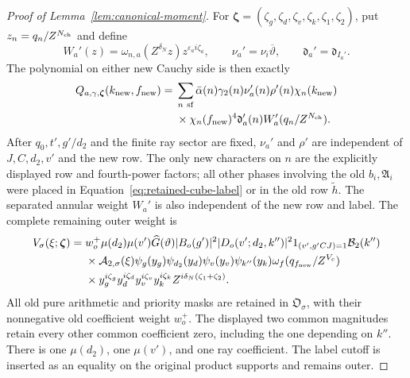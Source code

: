 \documentclass[11pt,a4paper]{article}
\numberwithin{equation}{section}
\numberwithin{figure}{section}
\theoremstyle{definition}
\theoremstyle{remark}
\begin{document}
\begin{proof}[Proof of Lemma~\ref{lem:canonical-moment}]
For \(\boldsymbol\zeta=(\zeta_g,\zeta_d,\zeta_v,\zeta_k,
\zeta_1,\zeta_2)\), put \(z_n=q_n/Z^{N_{\rm ch}}\) and define
\[
 W_a'(z)=\omega_{n,a}(Z^{\delta_N}z)z^{\varepsilon_a i\zeta_a},
 \qquad \nu_a'=\nu_i\overline\vartheta,\qquad
 \mathfrak d_a'=\mathfrak d_{I_a'}.
\]
The polynomial on either new Cauchy side is then exactly
\begin{equation}\label{eq:canonical-child-polynomial}
 \begin{split}
 Q_{a,\gamma,\boldsymbol\zeta}(k_{\rm new},f_{\rm new})={}&
 \sum_{n\ {\rm sf}}\bar\alpha(n)\gamma_2(n)\nu_a'(n)\rho'(n)
 \chi_n(k_{\rm new})\\
 &\times\chi_n(f_{\rm new})^4
 \mathfrak d_a'(n)W_a'(q_n/Z^{N_{\rm ch}}).
 \end{split}
\end{equation}
After \(q_0,t',g'/d_2\) and the finite ray sector are fixed,
\(\nu_a'\) and \(\rho'\) are independent of \(J,C,d_2,v'\) and
the new row.  The only new characters on \(n\) are the explicitly
displayed row and fourth-power factors; all other phases involving
the old \(b_i,\mathfrak A_i\) were placed in
Equation~\eqref{eq:retained-cube-label} or in the old row
\(\widetilde h\).  The separated annular weight \(W_a'\) is also
independent of the new row and label.
The complete remaining outer weight is
\begin{equation}\label{eq:inverse-second-outer-weight}
 \begin{split}
 V_\sigma(\xi;\boldsymbol\zeta)={}&w_o^+\mu(d_2)\mu(v')\widehat G(\vartheta)
 |B_o(g')|^2|D_o(v';d_2,k'')|^2
 1_{(v',g'CJ)=1}\mathcal B_2(k'')\\
 &\times\mathcal A_{2,\sigma}(\xi)
 \psi_g(y_g)\psi_{d_2}(y_d)\psi_v(y_v)\psi_{k''}(y_k)
 \omega_f(q_{f_{\rm new}}/Z^{V_c})\\
 &\times y_g^{i\zeta_g}y_d^{i\zeta_d}y_v^{i\zeta_v}y_k^{i\zeta_k}
       Z^{i\delta_N(\zeta_1+\zeta_2)}.
 \end{split}
\end{equation}
All old pure arithmetic and priority masks are retained in
\(\mathfrak O_\sigma\), with their nonnegative old coefficient weight
\(w_o^+\).  The displayed two common magnitudes retain every other
common coefficient zero, including the one depending on \(k''\).
There is one \(\mu(d_2)\), one \(\mu(v')\), and one ray coefficient.
The label cutoff is inserted as an equality on the original product
supports and remains outer.


\end{proof}
\end{document}
